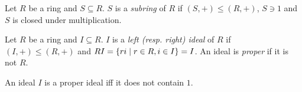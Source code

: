 \begin{definition}[subrings] \label{def:ring:sub}
    Let $R$ be a ring and $S \subseteq R$.
    $S$ is a \emph{subring} of $R$ if $(S, +) \le (R, +)$, $S \ni 1$ and
    $S$ is closed under multiplication.
\end{definition}
\begin{definition}[ideal] \label{def:ring:ideal}
    Let $R$ be a ring and $I \subseteq R$.
    $I$ is a \emph{left (resp. right) ideal} of $R$ if $(I, +) \le (R, +)$
    and $RI = \{ri \mid r \in R, i \in I\} = I$.
    An ideal is \emph{proper} if it is not $R$.
\end{definition}
\begin{examples}
    \item An ideal $I$ is a proper ideal iff it does not contain $1$.
\end{examples}
